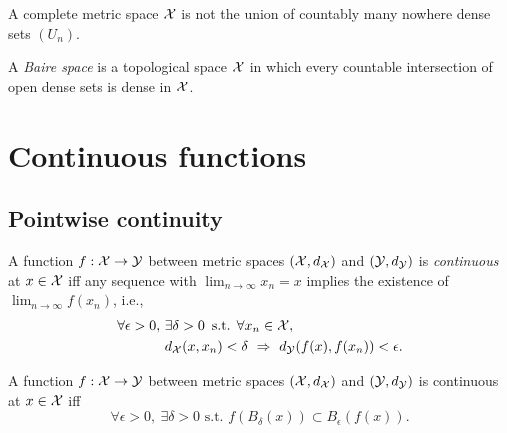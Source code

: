 \begin{coro}
  \label{coro:BaireCat}
  A complete metric space ${\cal X}$ is 
  not the union of countably many nowhere dense sets $(U_n)$.
\end{coro}

\begin{defn}
  A \emph{Baire space} is a topological space ${\cal X}$
  in which every countable intersection of open dense sets
  is dense in ${\cal X}$.
\end{defn}

\section{Continuous functions}
\label{sec:continuous-functions-metricSpaces}

\subsection{Pointwise continuity}
\label{sec:pointwise-continuity}

\begin{defn}
  \label{def:continuousFuncPointMetricSpace}
  A function $f: {\cal X} \rightarrow {\cal Y}$
  between metric spaces $({\cal X},d_{\cal X})$
  and $({\cal Y}, d_{\cal Y})$
  is \emph{continuous} at $x\in{\cal X}$ iff 
  any sequence with $\lim_{n\rightarrow \infty}x_n = x$
  implies the existence of $\lim_{n\rightarrow \infty}f(x_n)$, 
  i.e., 
  \begin{align}
    \label{eq:continuousFuncPointMetricSpace}
    \forall \epsilon>0,\ &\exists \delta>0\, \text{ s.t. }
    \forall x_n \in {\cal X}, \ \
    \\ \nonumber
                         &d_{\cal X}(x,x_n)<\delta\ \Rightarrow\
                           d_{\cal Y}(f(x),f(x_n))<\epsilon. 
  \end{align}
\end{defn}

\begin{lem}
  \label{lem:pointContinuityBall}
  A function $f: {\cal X} \rightarrow {\cal Y}$
  between metric spaces $({\cal X},d_{\cal X})$
  and $({\cal Y}, d_{\cal Y})$
  is continuous at $x\in{\cal X}$ iff 
  \begin{equation}
    \label{eq:pointContinuityBall}
    \forall \epsilon > 0, \ \exists \delta>0 \text{ s.t. }
    f(B_{\delta}(x)) \subset B_{\epsilon}(f(x)).
  \end{equation}
\end{lem}

